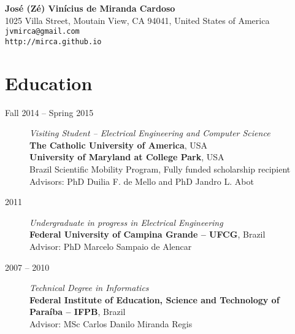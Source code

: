 \documentclass[10pt]{article}
\begin{document}
\pagestyle{empty}
\begin{titlepage}
 \begin{center}
     {\Large{\textbf{Jos\'e (Z\'e) Vin\'icius de Miranda Cardoso}}}\\
  1025 Villa Street, Moutain View, CA 94041, United States of America \\
  \texttt{jvmirca@gmail.com}\\ \texttt{http://mirca.github.io} \\
 \end{center}

\section{Education}

\begin{description}
 \item[Fall 2014 -- Spring 2015] \emph{Visiting Student -- Electrical Engineering and Computer Science} \\\textbf{The Catholic University of America}, USA\\
\textbf{University of Maryland at College Park}, USA \\ Brazil Scientific Mobility
 Program, Fully funded scholarship recipient \\ Advisors: PhD Duilia F. de Mello and PhD Jandro L. Abot
 \item[2011] \emph{Undergraduate in progress in Electrical Engineering} \\\textbf{Federal University of Campina Grande -- UFCG}, Brazil\\ Advisor: PhD Marcelo Sampaio de Alencar
 \item[2007 -- 2010] \emph{Technical Degree in Informatics} \\ \textbf{Federal Institute of Education, Science and Technology of Para\'iba -- IFPB}, Brazil \\ Advisor: MSc Carlos Danilo Miranda Regis
\end{description}


\end{titlepage}
\end{document}
